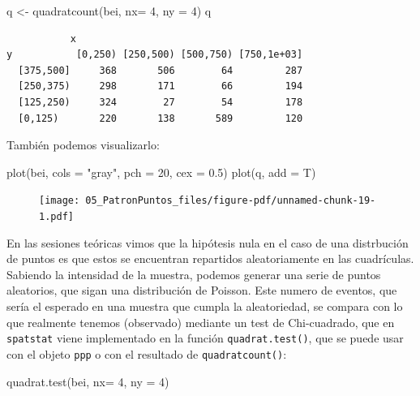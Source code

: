 \documentclass[
  letterpaper,
  DIV=11,
  numbers=noendperiod]{scrreprt}
\newenvironment{Shaded}{\begin{snugshade}}{\end{snugshade}}
\newcommand{\AttributeTok}[1]{\textcolor[rgb]{0.40,0.45,0.13}{#1}}
\newcommand{\DecValTok}[1]{\textcolor[rgb]{0.68,0.00,0.00}{#1}}
\newcommand{\FloatTok}[1]{\textcolor[rgb]{0.68,0.00,0.00}{#1}}
\newcommand{\FunctionTok}[1]{\textcolor[rgb]{0.28,0.35,0.67}{#1}}
\newcommand{\NormalTok}[1]{\textcolor[rgb]{0.00,0.23,0.31}{#1}}
\newcommand{\OtherTok}[1]{\textcolor[rgb]{0.00,0.23,0.31}{#1}}
\newcommand{\StringTok}[1]{\textcolor[rgb]{0.13,0.47,0.30}{#1}}
\begin{document}
\begin{Shaded}
\begin{Highlighting}[]
\NormalTok{q }\OtherTok{\textless{}{-}} \FunctionTok{quadratcount}\NormalTok{(bei, }\AttributeTok{nx=} \DecValTok{4}\NormalTok{, }\AttributeTok{ny =} \DecValTok{4}\NormalTok{)}
\NormalTok{q}
\end{Highlighting}
\end{Shaded}

\begin{verbatim}
           x
y           [0,250) [250,500) [500,750) [750,1e+03]
  [375,500]     368       506        64         287
  [250,375)     298       171        66         194
  [125,250)     324        27        54         178
  [0,125)       220       138       589         120
\end{verbatim}

También podemos visualizarlo:

\begin{Shaded}
\begin{Highlighting}[]
\FunctionTok{plot}\NormalTok{(bei, }\AttributeTok{cols =} \StringTok{"gray"}\NormalTok{, }\AttributeTok{pch =} \DecValTok{20}\NormalTok{, }\AttributeTok{cex =} \FloatTok{0.5}\NormalTok{)}
\FunctionTok{plot}\NormalTok{(q, }\AttributeTok{add =}\NormalTok{ T)}
\end{Highlighting}
\end{Shaded}

\begin{figure}[H]

{\centering \texttt{[image: 05\_PatronPuntos\_files/figure-pdf/unnamed-chunk-19-1.pdf]}

}

\end{figure}

En las sesiones teóricas vimos que la hipótesis nula en el caso de una
distrbución de puntos es que estos se encuentran repartidos
aleatoriamente en las cuadrículas. Sabiendo la intensidad de la muestra,
podemos generar una serie de puntos aleatorios, que sigan una
distribución de Poisson. Este numero de eventos, que sería el esperado
en una muestra que cumpla la aleatoriedad, se compara con lo que
realmente tenemos (observado) mediante un test de Chi-cuadrado, que en
\texttt{spatstat} viene implementado en la función
\texttt{quadrat.test()}, que se puede usar con el objeto \texttt{ppp} o
con el resultado de \texttt{quadratcount()}:

\begin{Shaded}
\begin{Highlighting}[]
\FunctionTok{quadrat.test}\NormalTok{(bei, }\AttributeTok{nx=} \DecValTok{4}\NormalTok{, }\AttributeTok{ny =} \DecValTok{4}\NormalTok{)}
\end{Highlighting}
\end{Shaded}
\end{document}
